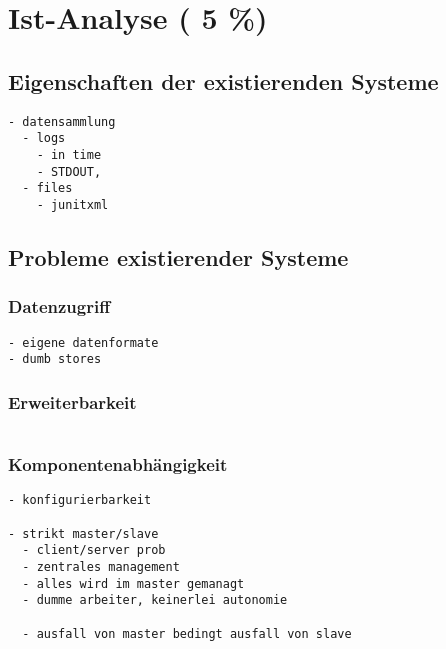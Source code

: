 \chapter{Ist-Analyse ( 5 \%)}
\label{chap:ist-analyse}







\section{Eigenschaften der existierenden Systeme}

\begin{verbatim}
- datensammlung
  - logs
    - in time
    - STDOUT,
  - files
    - junitxml
\end{verbatim}

\section{Probleme existierender Systeme}


\subsection{Datenzugriff}

\begin{verbatim}
- eigene datenformate
- dumb stores
\end{verbatim}

\subsection{Erweiterbarkeit}
\begin{verbatim}

\end{verbatim}


\subsection{Komponentenabh\"angigkeit}
\begin{verbatim}
- konfigurierbarkeit

- strikt master/slave
  - client/server prob
  - zentrales management
  - alles wird im master gemanagt
  - dumme arbeiter, keinerlei autonomie

  - ausfall von master bedingt ausfall von slave


\end{verbatim}

